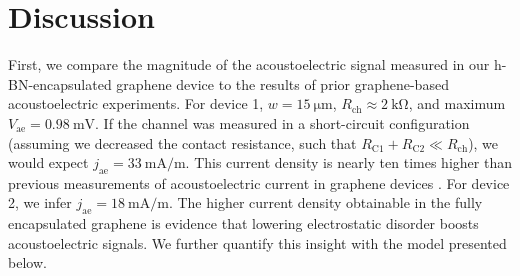 \documentclass{beavtex_dub_edit}
\begin{document}
\section{Discussion} \label{AE paper discussion}
First, we compare the magnitude of the acoustoelectric signal measured in our h-BN-encapsulated graphene device to the results of prior graphene-based acoustoelectric experiments. For device 1, $w = \SI{15}{\micro\meter}$, $R_{\mathrm{ch}} \approx \SI{2}{\kilo\ohm}$, and maximum  $V_{\mathrm{ae}} = \SI{0.98}{\milli\volt}$. If the channel was measured in a short-circuit configuration (assuming we decreased the contact resistance, such that $R_{\mathrm{C1}} + R_{\mathrm{C2}} \ll R_{\mathrm{ch}}$), we would expect $j_{\mathrm{ae}} = \SI{33}{\milli \ampere/\meter}$. This current density is nearly ten times higher than previous measurements of acoustoelectric current in graphene devices \cite{bandhu_controlling_2016,okuda_acoustic_2016,tang_ultra-low_2017,okuda_graphene_2018}. For device 2, we infer $j_{\mathrm{ae}} = \SI{18}{\milli \ampere/\meter}$. The higher current density obtainable in the fully encapsulated graphene is evidence that lowering electrostatic disorder boosts acoustoelectric signals. We further quantify this insight with the model presented below.
\end{document}
